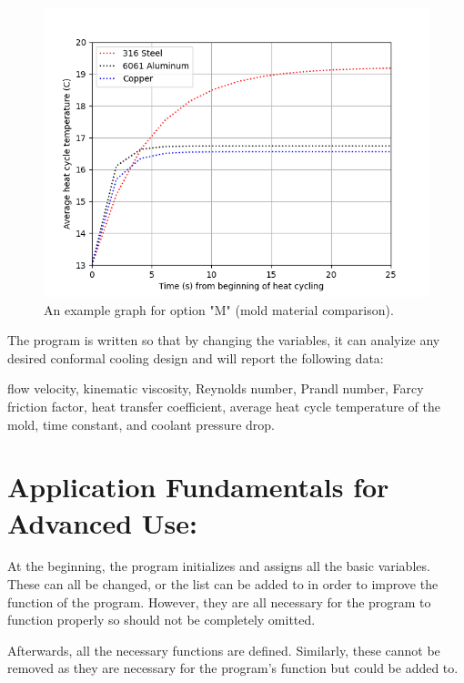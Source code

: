 \documentclass[a4paper,12pt]{article}
\begin{document}
\medskip
\begin{center}
\begin{figure}
\includegraphics[width=\linewidth]{paccman-example-graph.png}
\caption{An example graph for option "M" (mold material comparison). }
\end{figure}
\end{center}

The program is written so that by changing the variables, it can analyize any desired conformal cooling design and will report the following data: 
\begin{adjustwidth}{1cm}{}

flow velocity, kinematic viscosity, Reynolds number, Prandl number, Farcy friction factor, heat transfer coefficient, average heat cycle temperature of the mold, time constant, and coolant pressure drop.
\end{adjustwidth}
\clearpage

\section*{Application Fundamentals for Advanced Use:}

At the beginning, the program initializes and assigns all the basic variables. These can all be changed, or the list can be added to in order to improve the function of the program. However, they are all necessary for the program to function properly so should not be completely omitted.

\medskip

Afterwards, all the necessary functions are defined. Similarly, these cannot be removed as they are necessary for the program’s function but could be added to.
\end{document}
